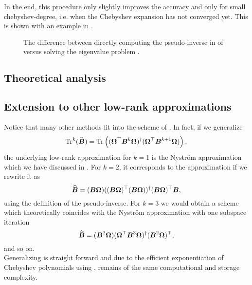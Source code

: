 In the end, this procedure only slightly improves the accuracy
and only for small \gls{chebyshev-degree}, i.e. when the Chebyshev expansion has
not converged yet. This is shown with an example in .

\begin{figure}[ht]
    \centering
    
    \caption{The difference between directly computing the pseudo-inverse
        in  of 
        versus solving the eigenvalue problem .}
    \label{fig:3-nystrom-eigenvalue-problem}
\end{figure}



\subsection{Theoretical analysis}
\label{subsec:3-nystrom-theoretical-analysis}



\subsection{Extension to other low-rank approximations}
\label{subsec:3-nystrom-other-low-rank}

Notice that many other methods \cite{halko2011finding,tropp2023randomized} fit
into the scheme of . In fact, if we
generalize
\begin{equation}
    \operatorname{Tr}^{k}(\widehat{\boldsymbol{B}})
        = \operatorname{Tr}\left((\boldsymbol{\Omega}^{\top} \boldsymbol{B}^k \boldsymbol{\Omega})^{\dagger} (\boldsymbol{\Omega}^{\top} \boldsymbol{B}^{k+1} \boldsymbol{\Omega}) \right),
    \label{equ:3-nystrom-trace-generalization}
\end{equation}
the underlying low-rank approximation for $k=1$ is the Nystr\"om approximation
which we have discussed in .
For $k=2$, it corresponds to the approximation 
if we rewrite it as
\begin{equation}
    \widehat{\boldsymbol{B}} = (\boldsymbol{B} \boldsymbol{\Omega}) ((\boldsymbol{B} \boldsymbol{\Omega})^{\top} (\boldsymbol{B} \boldsymbol{\Omega}))^{\dagger} (\boldsymbol{B} \boldsymbol{\Omega})^{\top} \boldsymbol{B},
    \label{equ:3-nystrom-RSVD-rewritten}
\end{equation}
using the definition of the pseudo-inverse.
For $k=3$ we would obtain a scheme which theoretically coincides with the Nystr\"om
approximation with one subspace iteration \cite{tropp2023randomized}
\begin{equation}
    \widehat{\boldsymbol{B}} = (\boldsymbol{B}^2 \boldsymbol{\Omega}) (\boldsymbol{\Omega}^{\top} \boldsymbol{B}^3 \boldsymbol{\Omega})^{\dagger} (\boldsymbol{B}^2 \boldsymbol{\Omega})^{\top},
    \label{equ:3-nystrom-nystrom-SI}
\end{equation}
and so on.\\

Generalizing  is straight forward and
due to the efficient exponentiation of Chebyshev polynomials using
, remains of the same
computational and storage complexity.
